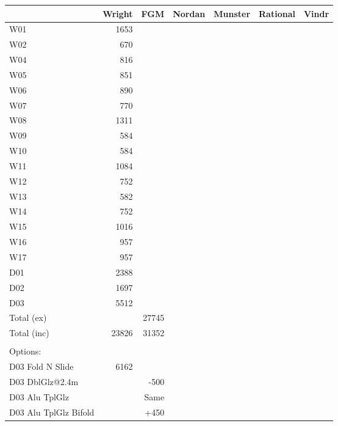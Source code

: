 \begin{tabular}{|p{4cm}||r|r|r|r|r|r|}
\hline
&Wright & FGM &Nordan &Munster & Rational & Vindr           
\\ \hline
W01 & 1653                              
\\ \hline
W02 & 670                            
\\ \hline
W04 & 816                             
\\ \hline
W05 & 851                            
\\ \hline
W06 & 890                            
\\ \hline
W07 & 770                            
\\ \hline
W08 & 1311                            
\\ \hline
W09 & 584                            
\\ \hline
W10 & 584                             
\\ \hline
W11 &1084                            
\\ \hline
W12 & 752                       
\\ \hline
W13  &582                           
\\ \hline
W14 & 752                            
\\ \hline
W15 &1016                            
\\ \hline
W16 &957                            
\\ \hline
W17 &957                            
\\ \hline
D01 &2388                            
\\ \hline
D02 &1697                            
\\ \hline
D03 &5512                            
\\ \hline
Total (ex)  & & 27745                    
\\ \hline
Total (inc) & 23826  &31352                  
\\ \hline
\\ \hline
Options: 
\\ \hline
D03 Fold N Slide & 6162
\\ \hline
D03 DblGlz@2.4m & & -500
\\ \hline
D03 Alu TplGlz & & Same
\\ \hline
D03 Alu TplGlz Bifold& & +450
\\ \hline

\end{tabular}

